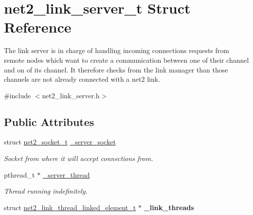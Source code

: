 \hypertarget{structnet2__link__server__t}{}\section{net2\+\_\+link\+\_\+server\+\_\+t Struct Reference}
\label{structnet2__link__server__t}


The link server is in charge of handling incoming connections requests from remote nodes which want to create a communication between one of their channel and on of its channel. It therefore checks from the link manager than those channels are not already connected with a net2 link.  




{\ttfamily \#include $<$net2\+\_\+link\+\_\+server.\+h$>$}

\subsection*{Public Attributes}
\begin{DoxyCompactItemize}
\item 
\hypertarget{structnet2__link__server__t_abcd4b2d9f1f25fc68d4100d1d897f11f}{}struct \hyperlink{structnet2__socket__t}{net2\+\_\+socket\+\_\+t} \hyperlink{structnet2__link__server__t_abcd4b2d9f1f25fc68d4100d1d897f11f}{\+\_\+server\+\_\+socket}\label{structnet2__link__server__t_abcd4b2d9f1f25fc68d4100d1d897f11f}

\begin{DoxyCompactList}\small\item\em Socket from where it will accept connections from. \end{DoxyCompactList}\item 
\hypertarget{structnet2__link__server__t_ade7ce485e3476cd2f003fd83c9226916}{}pthread\+\_\+t $\ast$ \hyperlink{structnet2__link__server__t_ade7ce485e3476cd2f003fd83c9226916}{\+\_\+server\+\_\+thread}\label{structnet2__link__server__t_ade7ce485e3476cd2f003fd83c9226916}

\begin{DoxyCompactList}\small\item\em Thread running indefinitely. \end{DoxyCompactList}\item 
\hypertarget{structnet2__link__server__t_aa827be9ec74ed0149e6ea70589f711bd}{}struct \hyperlink{structnet2__link__thread__linked__element__t}{net2\+\_\+link\+\_\+thread\+\_\+linked\+\_\+element\+\_\+t} $\ast$ {\bfseries \+\_\+link\+\_\+threads}\label{structnet2__link__server__t_aa827be9ec74ed0149e6ea70589f711bd}

\end{DoxyCompactItemize}


